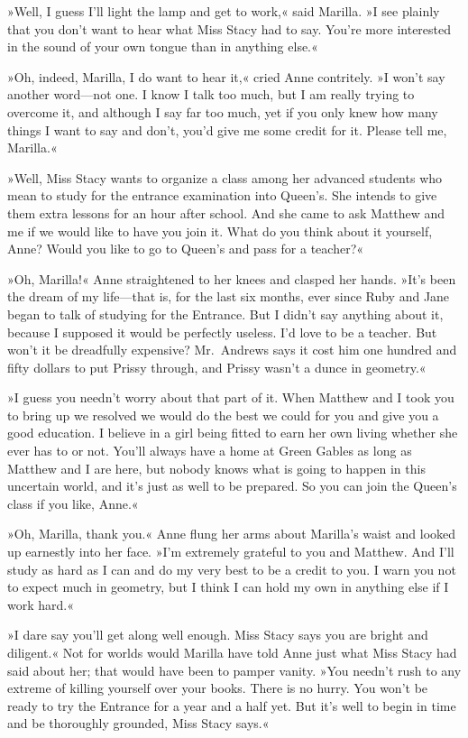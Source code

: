 »Well, I guess I'll light the lamp and get to work,« said Marilla. »I see plainly that you don't want to hear what Miss Stacy had to say. You're more interested in the sound of your own tongue than in anything else.«

»Oh, indeed, Marilla, I do want to hear it,« cried Anne contritely. »I won't say another word—not one. I know I talk too much, but I am really trying to overcome it, and although I say far too much, yet if you only knew how many things I want to say and don't, you'd give me some credit for it. Please tell me, Marilla.«

»Well, Miss Stacy wants to organize a class among her advanced students who mean to study for the entrance examination into Queen's. She intends to give them extra lessons for an hour after school. And she came to ask Matthew and me if we would like to have you join it. What do you think about it yourself, Anne? Would you like to go to Queen's and pass for a teacher?«

»Oh, Marilla!« Anne straightened to her knees and clasped her hands. »It's been the dream of my life—that is, for the last six months, ever since Ruby and Jane began to talk of studying for the Entrance. But I didn't say anything about it, because I supposed it would be perfectly useless. I'd love to be a teacher. But won't it be dreadfully expensive? Mr.~Andrews says it cost him one hundred and fifty dollars to put Prissy through, and Prissy wasn't a dunce in geometry.«

»I guess you needn't worry about that part of it. When Matthew and I took you to bring up we resolved we would do the best we could for you and give you a good education. I believe in a girl being fitted to earn her own living whether she ever has to or not. You'll always have a home at Green Gables as long as Matthew and I are here, but nobody knows what is going to happen in this uncertain world, and it's just as well to be prepared. So you can join the Queen's class if you like, Anne.«

»Oh, Marilla, thank you.« Anne flung her arms about Marilla's waist and looked up earnestly into her face. »I'm extremely grateful to you and Matthew. And I'll study as hard as I can and do my very best to be a credit to you. I warn you not to expect much in geometry, but I think I can hold my own in anything else if I work hard.«

»I dare say you'll get along well enough. Miss Stacy says you are bright and diligent.« Not for worlds would Marilla have told Anne just what Miss Stacy had said about her; that would have been to pamper vanity. »You needn't rush to any extreme of killing yourself over your books. There is no hurry. You won't be ready to try the Entrance for a year and a half yet. But it's well to begin in time and be thoroughly grounded, Miss Stacy says.«

